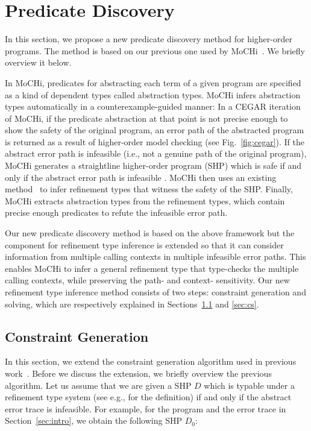 

\section{Predicate Discovery}

In this section, we propose a new predicate discovery method for 
higher-order programs.  The method is based on our previous one used by 
MoCHi~\cite{KobayashiPLDI2011}.  We briefly overview it below.

In MoCHi, predicates for abstracting each term of a given program are 
specified as a kind of dependent types called abstraction types.  MoCHi 
infers abstraction types automatically in a counterexample-guided manner: 
 In a CEGAR iteration of MoCHi, if the predicate abstraction at that 
point is not precise enough to show the safety of the original program, 
an error path of the abstracted program is returned as a result of 
higher-order model checking (see Fig.~\ref{fig:cegar}).  If the abstract 
error path is infeasible (i.e., not a genuine path of the original 
program), MoCHi generates a straightline higher-order program (SHP) 
which is safe if and only if the abstract error path is infeasible .  
MoCHi then uses an existing method~\cite{Unno2009} to infer refinement 
types that witness the safety of the SHP.  Finally, MoCHi extracts 
abstraction types from the refinement types, which contain precise 
enough predicates to refute the infeasible error path.

Our new predicate discovery method is based on the above framework but 
the component for refinement type inference is extended so that it can 
consider information from multiple calling contexts in multiple 
infeasible error paths.  This enables MoCHi to infer a general 
refinement type that type-checks the multiple calling contexts, while 
preserving the path- and context- sensitivity.  Our new refinement type 
inference method consists of two steps: constraint generation and 
solving, which are respectively explained in Sections~\ref{sec:cg} and 
\ref{sec:cs}.

\subsection{Constraint Generation}
\label{sec:cg}

In this section, we extend the constraint generation algorithm used in 
previous work~\cite{Unno2009,Terauchi2010,KobayashiPLDI2011}.  Before we 
discuss the extension, we briefly overview the previous algorithm.  Let 
us assume that we are given a SHP \(D\) which is typable under a 
refinement type system (see e.g., \cite{Unno2009} for the definition) if 
and only if the abstract error trace is infeasible.  For example, for 
the program and the error trace in Section~\ref{sec:intro}, we obtain 
the following SHP \(D_0\):\todo{}
%

